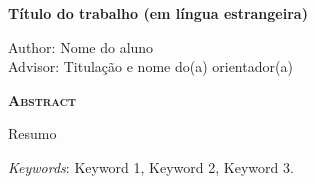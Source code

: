 \begin{center}
	{\Large{\textbf{Título do trabalho (em língua estrangeira)}}}
\end{center}

\vspace{1cm}

\begin{flushright}
	Author: Nome do aluno\\
	Advisor: Titulação e nome do(a) orientador(a)
\end{flushright}

\vspace{1cm}

\begin{center}
	\Large{\textsc{\textbf{Abstract}}}
\end{center}

\noindent Resumo

\noindent\textit{Keywords}: Keyword 1, Keyword 2, Keyword 3.
